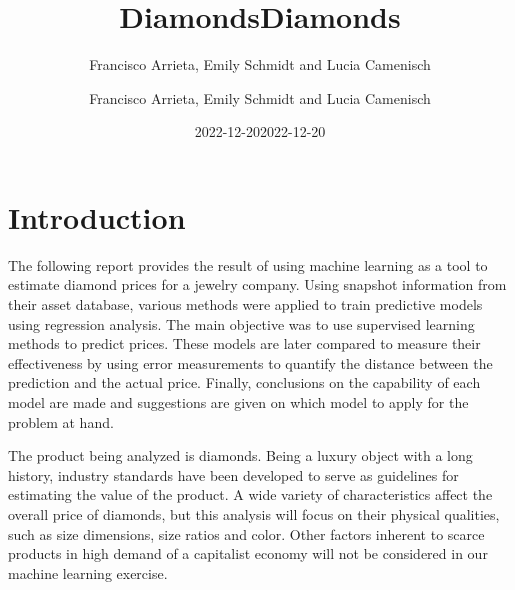 \documentclass[
  paper=a4,
  ,captions=tableheading
]{scrartcl}
\title{Diamonds}
\author{Francisco Arrieta, Emily Schmidt and Lucia Camenisch}
\date{2022-12-20}
\title{Diamonds}
\author{Francisco Arrieta, Emily Schmidt and Lucia Camenisch}
\date{2022-12-20}
\begin{document}
\begin{titlepage}
\newcommand{\colorRule}[3][black]{\textcolor[HTML]{#1}{\rule{#2}{#3}}}
\end{titlepage}
\restoregeometry
{} 




{
\setcounter{tocdepth}{3}
\tableofcontents
}
\hypertarget{introduction}{%
\section{Introduction}\label{introduction}}

The following report provides the result of using machine learning as a
tool to estimate diamond prices for a jewelry company. Using snapshot
information from their asset database, various methods were applied to
train predictive models using regression analysis. The main objective
was to use supervised learning methods to predict prices. These models
are later compared to measure their effectiveness by using error
measurements to quantify the distance between the prediction and the
actual price. Finally, conclusions on the capability of each model are
made and suggestions are given on which model to apply for the problem
at hand.

The product being analyzed is diamonds. Being a luxury object with a
long history, industry standards have been developed to serve as
guidelines for estimating the value of the product. A wide variety of
characteristics affect the overall price of diamonds, but this analysis
will focus on their physical qualities, such as size dimensions, size
ratios and color. Other factors inherent to scarce products in high
demand of a capitalist economy will not be considered in our machine
learning exercise.
\end{document}
